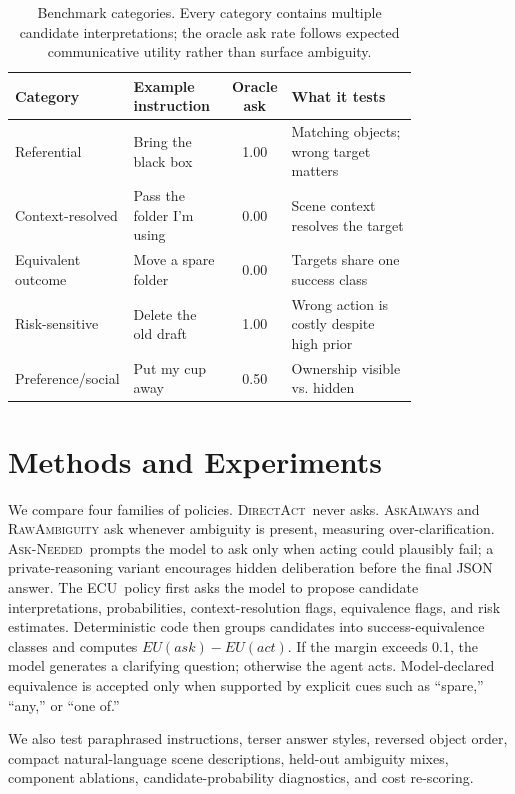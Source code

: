 \documentclass{article} %
\newcommand{\ecu}{\textsc{ECU}}
\newcommand{\askneeded}{\textsc{Ask-Needed}}
\newcommand{\directact}{\textsc{DirectAct}}
\begin{document}
\begin{table}[t]
\centering
\small
\begingroup
\renewcommand{\arraystretch}{1.5}
\begin{tabular}{@{}p{0.2\linewidth}p{0.25\linewidth}c p{0.35\linewidth}@{}}
\toprule
Category & Example instruction & Oracle ask & What it tests \\
\midrule
Referential & Bring the black box & 1.00 & Matching objects; wrong target matters \\
Context-resolved & Pass the folder I'm using & 0.00 & Scene context resolves the target \\
Equivalent outcome & Move a spare folder & 0.00 & Targets share one success class \\
Risk-sensitive & Delete the old draft & 1.00 & Wrong action is costly despite high prior \\
Preference/social & Put my cup away & 0.50 & Ownership visible vs. hidden \\
\bottomrule
\end{tabular}
\endgroup
\caption{Benchmark categories. Every category contains multiple candidate interpretations; the oracle ask rate follows expected communicative utility rather than surface ambiguity.}
\label{tab:benchmark-categories}
\end{table}

\section{Methods and Experiments}

We compare four families of policies. \directact\ never asks. \textsc{AskAlways} and \textsc{RawAmbiguity} ask whenever ambiguity is present, measuring over-clarification. \askneeded\ prompts the model to ask only when acting could plausibly fail; a private-reasoning variant encourages hidden deliberation before the final JSON answer. The \ecu\ policy first asks the model to propose candidate interpretations, probabilities, context-resolution flags, equivalence flags, and risk estimates. Deterministic code then groups candidates into success-equivalence classes and computes $EU(ask)-EU(act)$. If the margin exceeds 0.1, the model generates a clarifying question; otherwise the agent acts. Model-declared equivalence is accepted only when supported by explicit cues such as ``spare,'' ``any,'' or ``one of.''

We also test paraphrased instructions, terser answer styles, reversed object order, compact natural-language scene descriptions, held-out ambiguity mixes, component ablations, candidate-probability diagnostics, and cost re-scoring.
\end{document}
